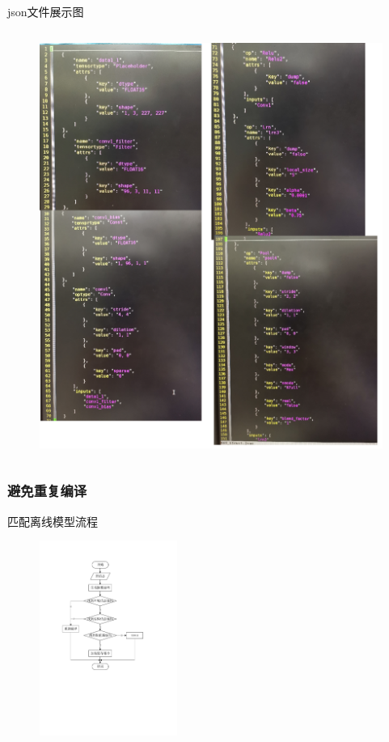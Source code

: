 \documentclass[12pt]{ctexbeamer}
\begin{document}
\begin{frame}
\begin{block}{json文件展示图}
\begin{columns}
\begin{column}{0.4\textwidth}
\begin{figure}
		        \includegraphics[width=1.0\textwidth]{figures/net_struct.png}
                \end{figure}
            \end{column}
     \end{columns}
  \end{block}
\end{frame}

\begin{frame}
  \frametitle{避免重复编译}
    匹配离线模型流程
    \begin{figure}
	  \includegraphics[width=0.4\textwidth]{figures/get_cache_model.pdf}
    \end{figure}
\end{frame}
\end{document}

